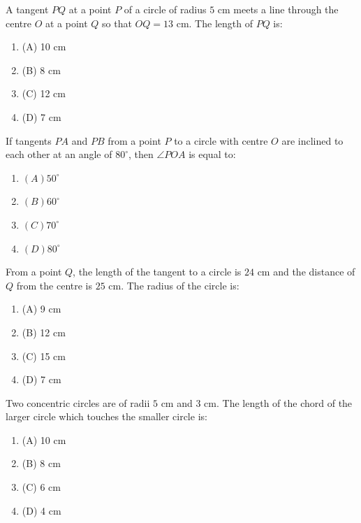 \documentclass[12pt,a4paper]{exam}
\begin{document}
\begin{questions}
\question[1] A tangent $PQ$ at a point $P$ of a circle of radius $5 \text{ cm}$ meets a line through the centre $O$ at a point $Q$ so that $OQ = 13 \text{ cm}$. The length of $PQ$ is:
\begin{enumerate}[label=(\Alph*)]
  \item (A) 10 cm
  \item (B) 8 cm
  \item (C) 12 cm
  \item (D) 7 cm
\end{enumerate}
\vspace{0.15cm}

\question[1] If tangents $PA$ and $PB$ from a point $P$ to a circle with centre $O$ are inclined to each other at an angle of $80^\circ$, then $\angle POA$ is equal to:
\begin{enumerate}[label=(\Alph*)]
  \item $(A) 50^\circ$
  \item $(B) 60^\circ$
  \item $(C) 70^\circ$
  \item $(D) 80^\circ$
\end{enumerate}
\vspace{0.15cm}

\question[1] From a point $Q$, the length of the tangent to a circle is $24 \text{ cm}$ and the distance of $Q$ from the centre is $25 \text{ cm}$. The radius of the circle is:
\begin{enumerate}[label=(\Alph*)]
  \item (A) 9 cm
  \item (B) 12 cm
  \item (C) 15 cm
  \item (D) 7 cm
\end{enumerate}
\vspace{0.15cm}

\question[1] Two concentric circles are of radii $5 \text{ cm}$ and $3 \text{ cm}$. The length of the chord of the larger circle which touches the smaller circle is:
\begin{enumerate}[label=(\Alph*)]
  \item (A) 10 cm
  \item (B) 8 cm
  \item (C) 6 cm
  \item (D) 4 cm
\end{enumerate}
\vspace{0.15cm}


\end{questions}
\end{document}
